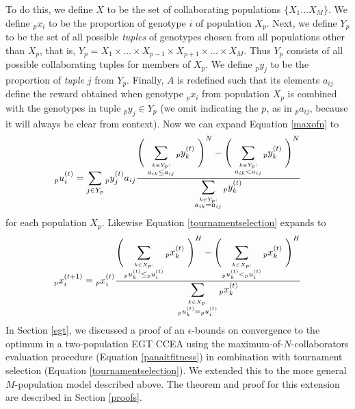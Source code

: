 \documentclass{sig-alt-full}
\newcommand\strt{\rule{0pt}{1.8em}}
\newcommand\suma[1]{\displaystyle\sum_{#1}}
\newcommand\sumb[2]{\displaystyle\sum_{\stackrel{{#1} :}{#2}}}
\begin{document}
To do this, we define \(X\) to be the set of collaborating populations \(\{X_1 ... X_M\}\).  We define \(_px_i\) to be the proportion of genotype \(i\) of population \(X_p\).  Next, we define \(Y_p\) to be the set of all possible {\it tuples} of genotypes chosen from all populations other than \(X_p\), that is, \(Y_p = X_1 \times ... \times X_{p-1} \times X_{p+1} \times ... \times X_M\).  Thus \(Y_p\) consists of all possible collaborating tuples for members of \(X_p\).  We define \(_py_j\) to be the proportion of {\it tuple} \(j\) from \(Y_p\). Finally, \(A\) is redefined such that its elements \(a_{ij}\) define the reward obtained when genotype \(_px_i\) from population \(X_p\) is combined with the genotypes in tuple \(_py_j \in Y_p\) (we omit indicating the \(p\), as in \(_pa_{ij}\), because it will always be clear from context).  Now we can expand Equation \ref{maxofn} to
\begin{equation}
{_p}u^{(t)}_i =\suma{j \in Y_{p}} {{_p}y^{(t)}_j a_{i j} \frac{ \left( \strt \right. \sumb{k \in Y_{p}}{a_{i k} \leq a_{i j} } {_p}y^{(t)}_k \left . \strt\right)^N - \left( \strt \right . \sumb{k \in Y_{p}}{a_{i k} < a_{i j} } {_p}y^{(t)}_k \left . \strt \right)^N }{\sumb{k \in Y_{p}}{a_{i k} = a_{i j}} {_p}y^{(t)}_k} } 
\label{approx_eqn1}
\end{equation}
%
\noindent for each population \(X_p\).  Likewise Equation \ref{tournamentselection} expands to
%
\begin{equation}
{_p}x^{(t+1)}_i  = {_p}x^{(t)}_i \frac{ \left( \hspace{-0.25em}\strt \right . \sumb{k \in X_{p}}{{_p}u^{(t)}_k \leq {_p}u^{(t)}_i} {_p}x^{(t)}_k \left . \strt \right)^H - \left( \hspace{-0.25em} \strt \right . \sumb{k \in X_{p}}{{_p}u^{(t)}_k < {_p}u^{(t)}_i} {_p}x^{(t)}_k \left . \strt \right)^H }{\sumb{k \in X_{p}}{{_p}u^{(t)}_k = {_p}u^{(t)}_i} {_p}x^{(t)}_k} 
\label{approx_eqn2}
\end{equation}
In Section \ref{egt}, we discussed a proof of an \(\epsilon\)-bounds on convergence to the optimum in a two-population EGT CCEA using the maximum-of-\(N\)-collaborators evaluation procedure (Equation \ref{panaitfitness}) in combination with tournament selection (Equation \ref{tournamentselection}).    We extended this to the more general \(M\)-population model described above.  The theorem and proof for this extension are described in Section \ref{proofs}.
\end{document}
